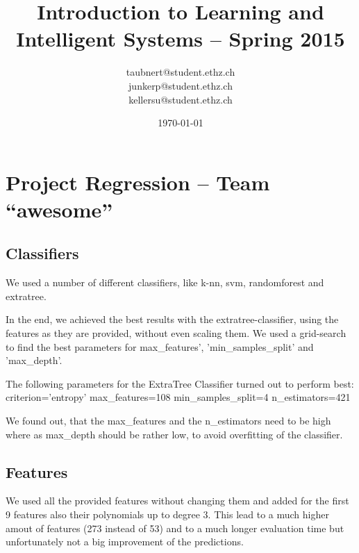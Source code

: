 \documentclass[a4paper, 11pt]{article}
\title{Introduction to Learning and Intelligent Systems -- Spring 2015}
\author{taubnert@student.ethz.ch\\ junkerp@student.ethz.ch\\ kellersu@student.ethz.ch\\}
\date{\today}
\begin{document}
\maketitle

\section{Project Regression -- Team ``awesome''}


\subsection{Classifiers}
We used a number of different classifiers, like k-nn, svm, randomforest and extratree.

In the end, we achieved the best results with the extratree-classifier, using the features as they are provided, without even scaling them.
We used a grid-search to find the best parameters for max_features', 'min_samples_split' and 'max_depth'.

The following parameters for the ExtraTree Classifier turned out to perform best:
criterion='entropy'
max_features=108
min_samples_split=4
n_estimators=421

We found out, that the max_features and the n_estimators need to be high where as max_depth should be rather low, to avoid overfitting of the classifier.


\subsection{Features}
We used all the provided features without changing them and added for the first 9 features also their polynomials up to degree 3. This lead to a much higher amout of features (273 instead of 53) and to a much longer evaluation time but unfortunately not a big improvement of the predictions.
\end{document}
